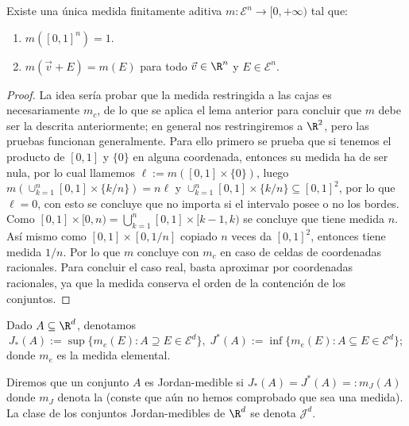 \begin{thm}
	Existe una única medida finitamente aditiva $m:\mathcal{E}^n \to [0,+\infty)$ tal que:
	\begin{enumerate}
		\item $m([0,1]^n) = 1$.
		\item $m(\vec v+E) = m(E)$ para todo $\vec v\in\R^n$ y $E\in\mathcal{E}^n$.
	\end{enumerate}
\end{thm}
\begin{proof}
	La idea sería probar que la medida restringida a las cajas es necesariamente $m_c$,
	de lo que se aplica el lema anterior para concluir que $m$ debe ser la descrita anteriormente;
	en general nos restringiremos a $\R^2$, pero las pruebas funcionan generalmente.
	Para ello primero se prueba que si tenemos el producto de $[0,1]$ y $\{0\}$ en alguna coordenada, entonces su medida ha de ser nula,
	por lo cual llamemos $\ell := m([0,1]\times\{0\})$, luego $m\left( \cup_{k=1}^n [0,1]\times\{k/n\} \right) = n\ell$ y
	$\cup_{k=1}^n [0,1]\times\{k/n\} \subseteq [0,1]^2$, por lo que $\ell = 0$, con esto se concluye que no importa si el intervalo posee o no los bordes.
	Como $[0,1]\times[0, n) = \bigcup_{k=1}^n [0,1]\times [k-1, k)$ se concluye que tiene medida $n$.
	Así mismo como $[0,1] \times [0, 1/n]$ copiado $n$ veces da $[0,1]^2$, entonces tiene medida $1/n$.
	Por lo que $m$ concluye con $m_c$ en caso de celdas de coordenadas racionales.
	Para concluir el caso real, basta aproximar por coordenadas racionales, ya que la medida conserva el orden de la contención de los conjuntos.
\end{proof}

\begin{mydefi}
	Dado $A \subseteq \R^d$, denotamos
	$$ J_*(A) := \sup\{m_e(E): A\supseteq E\in\mathcal{E}^d\}, \;
	J^*(A) := \inf\{m_e(E): A\subseteq E\in\mathcal{E}^d\}; $$
	donde $m_e$ es la medida elemental.
	\par
	Diremos que un conjunto $A$ es Jordan-medible si $J_*(A) = J^*(A) =: m_J(A)$ donde $m_J$ denota la  (conste que aún no hemos comprobado que sea una medida).
	La clase de los conjuntos Jordan-medibles de $\R^d$ se denota $\mathcal{J}^d$.
\end{mydefi}

